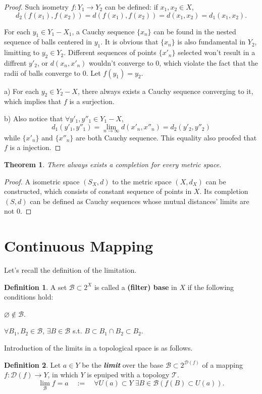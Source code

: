 \documentclass[openany]{book}
\newcommand*{\indexbf}[1]{\emph{\textbf{#1}}\index{#1}} %
\theoremstyle{plain}
\newtheorem{theorem}{Theorem}[section] %
\theoremstyle{definition}
\newtheorem{definition}{Definition}[section] %
\begin{document}
\begin{proof}
Such isometry $f:Y_1\to Y_2$ can be defined: if $x_1,x_2\in X$, 
\[
	d_2( f(x_1) , f(x_2) )=d(f(x_1), f(x_2)) = d(x_1 , x_2)=d_1(x_1, x_2).
\]

For each $y_1\in Y_1 - X_1$, a Cauchy sequence $\{x_n\}$ can be found in the nested sequence of balls centered in $y_1$. It is obvious that $\{x_n\}$ is also fundamental in $Y_2$, limitting to $y_2\in Y_2$. Different sequences of points $\{x'_n\}$ selected won't result in a diffrent $y'_2$, or $d(x_n,x'_n)$ wouldn't converge to $0$, which violate the fact that the radii of balls converge to $0$. Let $f(y_1)=y_2$. 

a) For each $y_2\in Y_2 - X$, there always exists a Cauchy sequence converging to it, which implies that $f$ is a surjection.

b) Also notice that $\forall y'_1,y''_1\in Y_1 - X$,
\[
	d_1(y'_1,y''_1)= \lim_{n\to\infty} d(x'_n,x''_n)=d_2(y'_2,y''_2)
\]
while $\{x'_n\}$ and $\{x''_n\}$ are both Cauchy sequence. This equality also proofed that $f$ is a injection.
\end{proof}
\begin{theorem}\label{completion_exists}
There always exists a completion for every metric space.
\end{theorem}
\begin{proof}
	A isometric space $(S_X, d)$ to the metric space $(X, d_X)$ can be constructed, which consists of constant sequence of points in $X$. Its completion $(S, d)$ can be defined as Cauchy sequences whose mutual distances' limits are not $0$.
\end{proof}
\section{Continuous Mapping}
Let's recall the definition of the limitation.
\begin{definition}\label{filter_base}
A set $\mathscr{B}\subset 2^X$ is called a \textbf{(filter) base} in $X$ if the following conditions hold:
\begin{conditionlist}[label=\alph*)]
\item $\varnothing \notin \mathscr{B}$.
\item $\forall B_1,B_2\in \mathscr{B}$, $\exists B\in \mathscr{B}$ s.t. $B\subset B_1\cap B_2\subset B_2$. 
\end{conditionlist}
\end{definition}
Introduction of the limits in a topological space is as follows.
\begin{definition}\label{limit}
Let $a\in Y$ be the \indexbf{limit} over the base $\mathscr{B}\subset 2^{\mathscr{D}(f)}$ of a mapping $f:\mathscr{D}( f )\to Y$, in which $Y$ is epuiped with a topology $\mathscr{T}$. 
\[
	\lim_\mathscr{B} f = a 
	\quad:=\quad
	\forall U(a)\subset Y\;
	\exists B\in \mathscr{B}(f(B)\subset U(a)).
\]
\end{definition}
\end{document}
